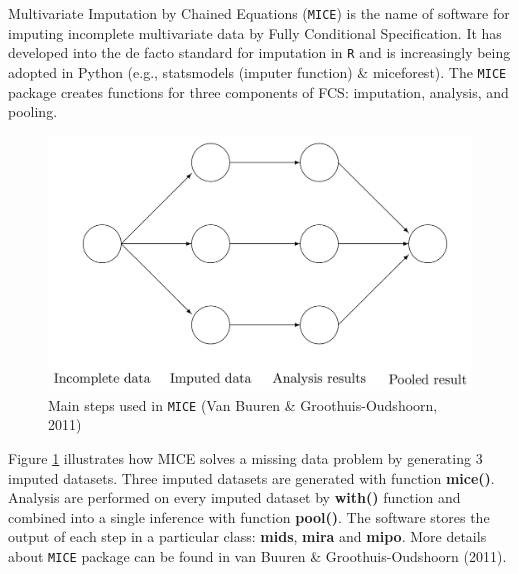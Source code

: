 \documentclass[12pt, fullpage, a4paper]{article}
\begin{document}
Multivariate Imputation by Chained Equations (\texttt{MICE}) is the name of software for imputing incomplete multivariate data by Fully Conditional Specification. It has developed into the de facto standard for imputation in \texttt{R} and is increasingly being adopted in Python (e.g., statsmodels (imputer function) \& miceforest). The \texttt{MICE} package creates functions for three components of FCS: imputation, analysis, and pooling. 
\begin{figure}[ht!]
	\centering
	\includegraphics[scale=.2]{plots/miflow}
	\caption{Main steps used in \texttt{MICE} (Van Buuren \& Groothuis-Oudshoorn, 2011)}
	\label{fig6_1}
\end{figure} 
Figure \ref{fig6_1} illustrates how MICE solves a missing data problem by generating 3 imputed datasets. Three imputed datasets are generated with function \textbf{mice()}. Analysis are performed on every imputed dataset by \textbf{with()} function and combined into a single inference with function \textbf{pool()}. The software stores the output of each step in a particular class: \textbf{mids}, \textbf{mira} and \textbf{mipo}. More details about \texttt{MICE} package can be found in van Buuren \& Groothuis-Oudshoorn (2011).\nocite{van2011mice}
\end{document}
